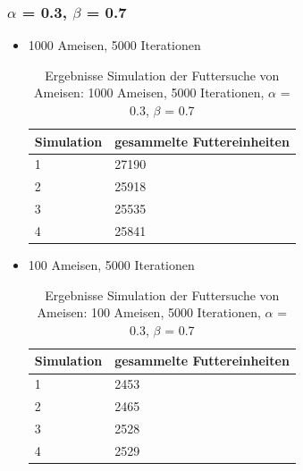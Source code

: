 \documentclass[a4paper, 11pt]{article}
\begin{document}
\subsubsection{$\alpha$ = 0.3, $\beta$ = 0.7}
\begin{itemize}
	\item 1000 Ameisen, 5000 Iterationen
	\begin{table}[h]
		\begin{tabular}{p{2.5cm}|p{11cm}}
			Simulation & gesammelte Futtereinheiten\\ \hline\hline
			1 & 27190\\ \hline
			2 & 25918\\ \hline
			3 & 25535\\ \hline
			4 & 25841\\ \hline
		\end{tabular}
		\caption{Ergebnisse Simulation der Futtersuche von Ameisen: 1000 Ameisen, 5000 Iterationen, $\alpha$ = 0.3, $\beta$ = 0.7}
		\label{tabframework}
	\end{table}
	\item 100 Ameisen, 5000 Iterationen
	\begin{table}[h]
		\begin{tabular}{p{2.5cm}|p{11cm}}
			Simulation & gesammelte Futtereinheiten\\ \hline\hline
			1 & 2453\\ \hline
			2 & 2465\\ \hline
			3 & 2528\\ \hline
			4 & 2529\\ \hline
		\end{tabular}
		\caption{Ergebnisse Simulation der Futtersuche von Ameisen: 100 Ameisen, 5000 Iterationen, $\alpha$ = 0.3, $\beta$ = 0.7}
		\label{tabframework}
	\end{table}
\end{itemize}
\newpage
\end{document}
